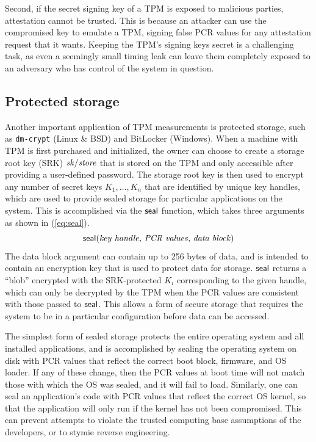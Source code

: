 \documentclass[11pt]{article}
\newcommand{\sk}[1]{\ensuremath{\mi{sk/#1}}}
\newcommand{\seal}[3]{\ms{seal}(#1,\, #2,\, #3)}
\begin{document}
Second, if the secret signing key of a TPM is exposed to malicious parties, attestation cannot be trusted. This is because an attacker can use the compromised key to emulate a TPM, signing false PCR values for any attestation request that it wants. Keeping the TPM's signing keys secret is a challenging task, as even a seemingly small timing leak can leave them completely exposed to an adversary who has control of the system in question.

\subsection{Protected storage}

Another important application of TPM measurements is protected storage, such as \verb'dm-crypt' (Linux \& BSD) and BitLocker (Windows). When a machine with TPM is first purchased and initialized, the owner can choose to create a storage root key (SRK) $\sk{store}$ that is stored on the TPM and only accessible after providing a user-defined password. The storage root key is then used to encrypt any number of secret keys $K_1, \ldots, K_n$ that are identified by unique key handles, which are used to provide sealed storage for particular applications on the system. This is accomplished via the $\mathsf{seal}$ function, which takes three arguments as shown in (\ref{eq:seal}).
\begin{equation}
\label{eq:seal}
\seal{\mathit{key~handle}}{\mathit{PCR~values}}{\mathit{data~block}}
\end{equation}
The data block argument can contain up to 256 bytes of data, and is intended to contain an encryption key that is used to protect data for storage. $\mathsf{seal}$ returns a ``blob'' encrypted with the SRK-protected $K_i$ corresponding to the given handle, which can only be decrypted by the TPM when the PCR values are consistent with those passed to $\mathsf{seal}$. This allows a form of secure storage that requires the system to be in a particular configuration before data can be accessed.

The simplest form of sealed storage protects the entire operating system and all installed applications, and is accomplished by sealing the operating system on disk with PCR values that reflect the correct boot block, firmware, and OS loader. If any of these change, then the PCR values at boot time will not match those with which the OS was sealed, and it will fail to load. Similarly, one can seal an application's code with PCR values that reflect the correct OS kernel, so that the application will only run if the kernel has not been compromised. This can prevent attempts to violate the trusted computing base assumptions of the developers, or to stymie reverse engineering.
\end{document}

